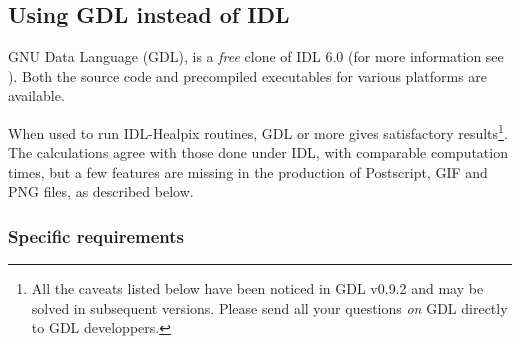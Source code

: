 \documentclass[12pt,twoside]{article}
\begin{document}
\subsection{Using GDL instead of IDL}
\label{sec:using_gdl}

GNU Data Language (GDL), is a {\em free} clone of IDL 6.0 (for more information see
).
Both the source code and precompiled executables for various platforms are available.

When used to run IDL-Healpix routines, GDL \gdlversion or more gives
satisfactory results\footnote{All the caveats listed below have been noticed in GDL v0.9.2
and may be solved in subsequent versions. Please send all your questions
{\em on} GDL directly to GDL developpers.}. The calculations agree with those done under IDL, with
comparable computation times, but a few features are missing in the production
of Postscript, GIF and PNG files, as described below.

\subsubsection*{Specific requirements}
\end{document}
